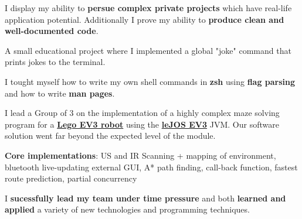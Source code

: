 \documentclass[]{jonas-cv}
\begin{document}
\begin{minipage}[t]{0.63\textwidth}
\begin{tightemize}
    \item[\faicon{angle-double-right}] I display my ability to \textbf{persue complex private projects} which have real-life application potential. Additionally I prove my ability to \textbf{produce clean and well-documented code}.
\end{tightemize}
\largesectionsep

\begin{tightemize}
    \item A small educational project where I implemented a global "joke" command that prints jokes to the terminal. 
    \item[\faicon{angle-double-right}] I tought myself how to write my own shell commands in \textbf{zsh} using \textbf{flag parsing} and how to write \textbf{man pages}.%
\end{tightemize}
\largesectionsep

\begin{tightemize}
   \item I lead a Group of 3 on the implementation of a highly complex maze solving program for a \href{https://education.lego.com/en-gb/product/mindstorms-ev3}{\textbf{Lego EV3 robot}} using the \href{http://www.lejos.org/}{\textbf{leJOS EV3}} JVM. 
   Our software solution went far beyond the expected level of the module.
   \item \textbf{Core implementations}: US and IR Scanning + mapping of environment, bluetooth live-updating external GUI, A* path finding, 
   call-back function, fastest route prediction, partial concurrency
   \vspace{2mm}

   \item[\faicon{angle-double-right}] I \textbf{sucessfully lead my team under time pressure} and both \textbf{learned and applied} a variety of new technologies and programming techniques.
\end{tightemize}



\end{minipage}
\end{document}
